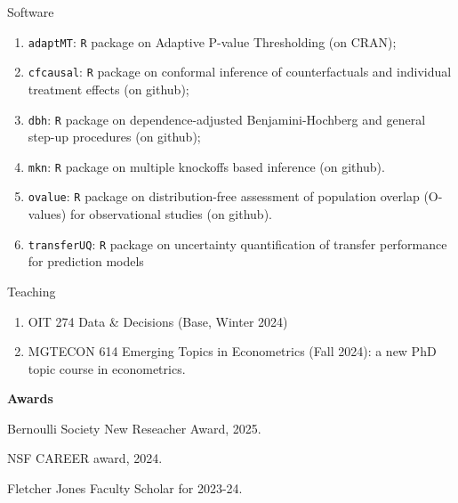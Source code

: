 \documentclass{article}
\newcommand{\red}[1]{{\color{red} #1}}
\begin{document}
\begin{large}
\noindent Software
\end{large}

\begin{enumerate}
\item \texttt{adaptMT}: \texttt{R} package on Adaptive P-value Thresholding (on CRAN);
\item \texttt{cfcausal}: \texttt{R} package on conformal inference of counterfactuals and individual treatment effects (on github);
\item \texttt{dbh}: \texttt{R} package on dependence-adjusted Benjamini-Hochberg and general step-up procedures (on github);
\item \texttt{mkn}: \texttt{R} package on multiple knockoffs based inference (on github).
\item \texttt{ovalue}: \texttt{R} package on distribution-free assessment of population overlap (O-values) for observational studies (on github).
\item \texttt{transferUQ}: \texttt{R} package on uncertainty quantification of transfer performance for prediction models
\end{enumerate}

\begin{large}
\noindent Teaching
\end{large}

\begin{enumerate}
\item \red{OIT 274 Data \& Decisions (Base, Winter 2024)}
\item \red{MGTECON 614 Emerging Topics in Econometrics (Fall 2024): a new PhD topic course in econometrics. }
\end{enumerate}

\vspace{3mm}
\begin{large}
\noindent \textbf{Awards}
\end{large}

\vspace{5mm}

\red{Bernoulli Society New Reseacher Award, 2025.}

\vspace{2mm}

\red{NSF CAREER award, 2024.}

\vspace{2mm}

Fletcher Jones Faculty Scholar for 2023-24. 

\vspace{2mm}
\end{document}
